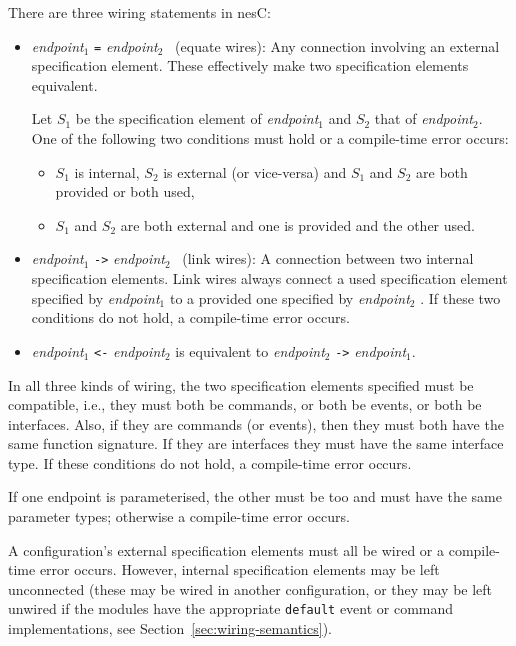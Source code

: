 \documentclass[11pt,letterpaper]{article}
\newcommand{\kw}[1]{{\tt #1}}
\newcommand{\code}[1]{{\tt #1}}
\newcommand{\nesc}{nesC\xspace}
\begin{document}
There are three wiring statements in \nesc:
\begin{itemize}
\item \emph{endpoint}$_1$ \code{=} \emph{endpoint}$_2$ \ (equate wires):
Any connection involving an external specification element. These
effectively make two specification elements equivalent.

Let $S_1$ be the specification element of \emph{endpoint}$_1$ and $S_2$
that of \emph{endpoint}$_2$. One of the following two conditions must hold
or a compile-time error occurs:
\begin{itemize}
\item $S_1$ is internal, $S_2$ is external (or vice-versa) and $S_1$ and
$S_2$ are both provided or both used,
\item $S_1$ and $S_2$ are both external and one is provided and the other used.
\end{itemize}

\item \emph{endpoint}$_1$ \code{->} \emph{endpoint}$_2$ \ (link wires): A
connection between two internal specification elements. Link wires always
connect a used specification element specified by \emph{endpoint}$_1$ to a
provided one specified by \emph{endpoint}$_2$ . If these two conditions do
not hold, a compile-time error occurs.

\item \emph{endpoint}$_1$ \code{<-} \emph{endpoint}$_2$ is equivalent to
\emph{endpoint}$_2$ \code{->} \emph{endpoint}$_1$.
\end{itemize}

In all three kinds of wiring, the two specification elements specified must
be compatible, i.e., they must both be commands, or both be events, or both
be interfaces. Also, if they are commands (or events), then they
must both have the same function signature. If they are interfaces
they must have the same interface type. If these conditions do not hold,
a compile-time error occurs.

If one endpoint is parameterised, the other must be too and must have the
same parameter types; otherwise a compile-time error occurs.

A configuration's external specification elements must all be wired or
a compile-time error occurs. However, internal specification elements
may be left unconnected (these may be wired in another configuration,
or they may be left unwired if the modules have the appropriate
\kw{default} event or command implementations, see
Section~\ref{sec:wiring-semantics}).
\end{document}
